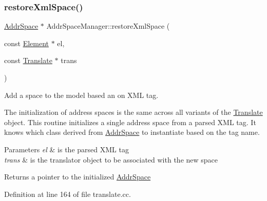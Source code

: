 \subsubsection{\texorpdfstring{restoreXmlSpace()}{restoreXmlSpace()}}
{\footnotesize\ttfamily \mbox{\hyperlink{class_addr_space}{Addr\+Space}} $\ast$ Addr\+Space\+Manager\+::restore\+Xml\+Space (\begin{DoxyParamCaption}\item[{const \mbox{\hyperlink{class_element}{Element}} $\ast$}]{el,  }\item[{const \mbox{\hyperlink{class_translate}{Translate}} $\ast$}]{trans }\end{DoxyParamCaption})\hspace{0.3cm}{\ttfamily [protected]}}



Add a space to the model based an on X\+ML tag. 

The initialization of address spaces is the same across all variants of the \mbox{\hyperlink{class_translate}{Translate}} object. This routine initializes a single address space from a parsed X\+ML tag. It knows which class derived from \mbox{\hyperlink{class_addr_space}{Addr\+Space}} to instantiate based on the tag name. 
\begin{DoxyParams}{Parameters}
{\em el} & is the parsed X\+ML tag \\
\hline
{\em trans} & is the translator object to be associated with the new space \\
\hline
\end{DoxyParams}
\begin{DoxyReturn}{Returns}
a pointer to the initialized \mbox{\hyperlink{class_addr_space}{Addr\+Space}} 
\end{DoxyReturn}


Definition at line 164 of file translate.\+cc.

